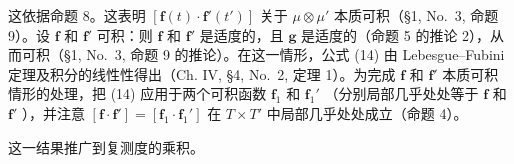 这依据命题 8。这表明 \([\mathbf{f}(t) \cdot \mathbf{f}'(t')]\) 关于 \(\mu \otimes \mu'\) 本质可积（§1, No.~3, 命题 9）。设 \(\mathbf{f}\) 和 \(\mathbf{f}'\) 可积：则 \(\mathbf{f}\) 和 \(\mathbf{f}'\) 是适度的，且 \(\mathbf{g}\) 是适度的（命题 5 的推论 2），从而可积（§1, No.~3, 命题 9 的推论）。在这一情形，公式 (14) 由 Lebesgue--Fubini 定理及积分的线性性得出（Ch. IV, §4, No.~2, 定理 1）。为完成 \(\mathbf{f}\) 和 \(\mathbf{f}'\) 本质可积情形的处理，把 (14) 应用于两个可积函数 \(\mathbf{f}_1\) 和 \(\mathbf{f}_1'\) （分别局部几乎处处等于 \(\mathbf{f}\) 和 \(\mathbf{f}'\) ），并注意 \([\mathbf{f} \cdot \mathbf{f}'] = [\mathbf{f}_1 \cdot \mathbf{f}_1']\) 在 \(T \times T'\) 中局部几乎处处成立（命题 4）。

这一结果推广到复测度的乘积。

